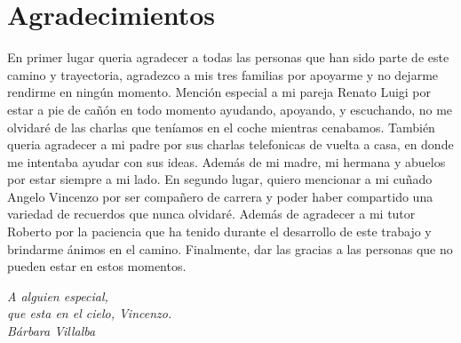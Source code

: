 \cleardoublepage

\chapter*{Agradecimientos}

En primer lugar queria agradecer a todas las personas que han sido parte de este camino y trayectoria, agradezco a mis tres familias por apoyarme y no 
dejarme rendirme en ningún momento. \newline
\newline
Mención especial a mi pareja Renato Luigi por estar a pie de cañón en todo momento ayudando, apoyando, y escuchando, no me olvidaré de las charlas que teníamos
en el coche mientras cenabamos. También queria agradecer a mi padre por sus charlas telefonicas de vuelta a casa, en donde me intentaba ayudar con sus ideas. Además de mi madre,
mi hermana y abuelos por estar siempre a mi lado.\newline
\newline
En segundo lugar, quiero mencionar a mi cuñado Angelo Vincenzo por ser compañero de carrera y poder haber compartido una variedad de recuerdos que nunca olvidaré. \newline
\newline
Además de agradecer a mi tutor Roberto por la paciencia que ha tenido durante el desarrollo de este trabajo y brindarme ánimos en el camino. \newline
\newline
Finalmente, dar las gracias a las personas que no pueden estar en estos momentos.


\begin{flushright}
	\vspace{4.0 cm}
	\emph{A alguien especial,\\
    que esta en el cielo, Vincenzo.}\\
	\emph{Bárbara Villalba}
\end{flushright}

\thispagestyle{empty}

